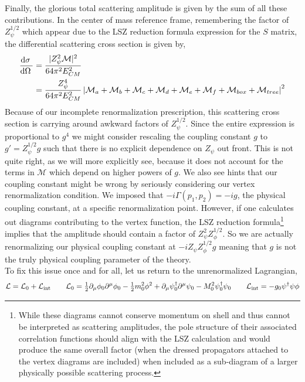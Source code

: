 \documentclass{article}
\begin{document}
Finally, the glorious total scattering amplitude is given by the sum of all these contributions. In the center of mass reference frame, remembering the factor of $Z_\psi^{1/2}$ which appear due to the LSZ reduction formula expression for the $S$ matrix, the differential scattering cross section is given by,
\begin{align*}
\frac{\mathrm{d}\sigma \:}{\mathrm{d}\Omega \:} & = \frac{|Z^2_{\psi} \mathcal{M}|^2}{64 \pi^2 E_{CM}^2}
\\
& = \frac{Z^4_{\psi}}{64 \pi^2 E_{CM}^2} \left| \mathcal{M}_a + \mathcal{M}_b + \mathcal{M}_c + \mathcal{M}_d + \mathcal{M}_e + \mathcal{M}_f + \mathcal{M}_{box} + \mathcal{M}_{tree} \right|^2 
\end{align*}
Because of our incomplete renormalization prescription, this scattering cross section is carrying around awkward factors of $Z_\psi^{1/2}$. Since the entire expression is proportional to $g^4$ we might consider rescaling the coupling constant $g$ to $g' = Z_\psi^{1/2} g$ such that there is no explicit dependence on $Z_\psi$ out front. This is not quite right, as we will more explicitly see, because it does not account for the terms in $\mathcal{M}$ which depend on higher powers of $g$. We also see hints that our coupling constant might be wrong by seriously considering our vertex renormalization condition. We imposed that $-i \Gamma(p_1, p_2) = -ig$, the physical coupling constant, at a specific renormalization point. However, if one calculates out diagrams contributing to the vertex function, the LSZ reduction formula\footnote{While these diagrams cannot conserve momentum on shell and thus cannot be interpreted as scattering amplitudes, the pole structure of their associated correlation functions should align with the LSZ calculation and would produce the same overall factor (when the dressed propagators attached to the vertex diagrams are included) when included as a sub-diagram of a larger physically possible scattering process.} implies that the amplitude should contain a factor of $Z_\psi^2 Z_\phi^{1/2}$. So we are actually renormalizing our physical coupling constant at $- i Z_\psi Z_\phi^{1/2} g$ meaning that $g$ is not the truly physical coupling parameter of the theory. \bigskip\\
To fix this issue once and for all, let us return to the unrenormalized Lagrangian,
\[ \mathcal{L} = \mathcal{L}_0 + \mathcal{L}_{\mathrm{int}} \quad \quad \mathcal{L}_0 = \tfrac{1}{2} \partial_\mu \phi_0 \partial^\mu \phi_0 - \tfrac{1}{2} m_0^2 \phi^2 + \partial_\mu \psi^\dagger_0 \partial^\mu \psi_0 - M_0^2 \psi^\dagger_0 \psi_0 \quad \quad \mathcal{L}_{\mathrm{int}} = -g_0 \psi^\dagger \psi \phi \]  
\end{document}
